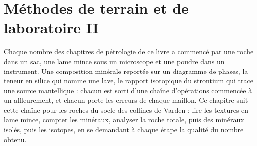 \chapter{Méthodes de terrain et de laboratoire II}\label{ch:b2:field-lab-methods-2}

Chaque nombre des chapitres de pétrologie de ce livre a commencé par une roche dans un sac, une lame mince sous
un microscope et une poudre dans un instrument. Une composition minérale reportée sur un diagramme de phases, la
teneur en silice qui nomme une lave, le rapport isotopique du strontium qui trace une source mantellique : chacun
est sorti d'une chaîne d'opérations commencée à un affleurement, et chacun porte les erreurs de chaque maillon.
Ce chapitre suit cette chaîne pour les roches du socle des collines de Varden : lire les textures en lame mince,
compter les minéraux, analyser la roche totale, puis des minéraux isolés, puis les isotopes, en se demandant à
chaque étape la qualité du nombre obtenu.

